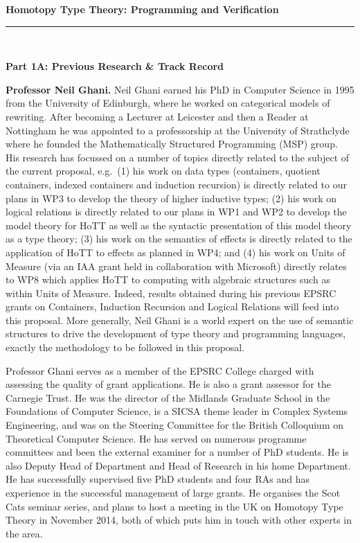 \documentclass[a4paper,11pt]{article}
\newcommand{\eg}{{e.g.}\ }
\begin{document}
\thispagestyle{plain}
\begin{center}
  {\Large {\bf Homotopy Type Theory: Programming and Verification}}\\[1ex] 

\vspace*{-0.1in}

  \rule{140mm}{.5mm}\\[2ex]
\end{center}

\noindent
{\bf \Large Part 1A: Previous Research \& Track Record}

\textbf{Professor Neil Ghani.} Neil Ghani earned his PhD in Computer
Science in 1995 from the University of Edinburgh, where he worked on
categorical models of rewriting.  After becoming a Lecturer at
Leicester and then a Reader at Nottingham he was appointed to a
professorship at the University of Strathclyde where he founded the
Mathematically Structured Programming (MSP) group. His research has
focussed on a number of topics directly related to the subject of the
current proposal, \eg (1) his work on data types (containers, quotient
containers, indexed containers and induction recursion) is directly
related to our plans in WP3 to develop the theory of higher inductive
types; (2) his work on logical relations is directly related to our
plans in WP1 and WP2 to develop the model theory for HoTT as well as
the syntactic presentation of this model theory as a type theory; (3)
his work on the semantics of effects is directly related to the
application of HoTT to effects as planned in WP4; and (4) his work on
Units of Measure (via an IAA grant held in collaboration with
Microsoft) directly relates to WP8 which applies HoTT to computing
with algebraic structures such as within Units of Measure. Indeed,
results obtained during his previous EPSRC grants on Containers,
Induction Recursion and Logical Relations will feed into this
proposal.  More generally, Neil Ghani is a world expert on the use of
semantic structures to drive the development of type theory and
programming languages, exactly the methodology to be followed in this
proposal.

Professor Ghani serves as a member of the EPSRC College charged with
assessing the quality of grant applications. He is also a grant
assessor for the Carnegie Trust.  He was the director of the Midlands
Graduate School in the Foundations of Computer Science, is a SICSA
theme leader in Complex Systems Engineering, and was on the Steering
Committee for the British Colloquium on Theoretical Computer Science.
He has served on numerous programme committees and been the external
examiner for a number of PhD students. He is also Deputy Head of
Department and Head of Research in his home Department. He has
successfully supervised five PhD students and four RAs and has
experience in the successful management of large grants. He organises
the Scot Cats seminar series, and plans to host a meeting in the UK on
Homotopy Type Theory in November 2014, both of which puts him in touch
with other experts in the area.
\end{document}
